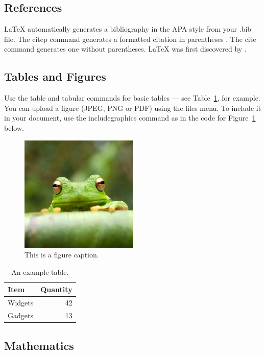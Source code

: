 \documentclass[letter,man,noextraspace,floatsintext]{apa6}
\begin{document}
\subsection{References}

LaTeX automatically generates a bibliography in the APA style from your .bib file. The citep command generates a formatted citation in parentheses \parencite{elliott_effective_2014}. The cite command generates one without parentheses. LaTeX was first discovered by \parencite{elliott_effective_2014}.

\subsection{Tables and Figures}

Use the table and tabular commands for basic tables --- see Table~\ref{tab:widgets}, for example. You can upload a figure (JPEG, PNG or PDF) using the files menu. To include it in your document, use the includegraphics command as in the code for Figure~\ref{fig:frog} below.

\begin{figure}
\centering
\includegraphics[width=0.5\textwidth]{frog.jpg}
\caption{\label{fig:frog}This is a figure caption.}
\end{figure}

\begin{table}
\centering
\begin{tabular}{l|r}
Item & Quantity \\\hline
Widgets & 42 \\
Gadgets & 13
\end{tabular}
\caption{\label{tab:widgets}An example table.}
\end{table}

\subsection{Mathematics}
\end{document}
